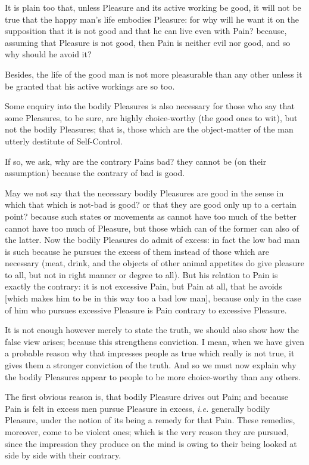 It is plain too that, unless Pleasure and its active working be good, it will
not be true that the happy man’s life embodies Pleasure: for why will he
want it on the supposition that it is not good and that he can live even with
Pain? because, assuming that Pleasure is not good, then Pain is neither evil
nor good, and so why should he avoid it?

Besides, the life of the good man is not more pleasurable than any other unless
it be granted that his active workings are so too.

Some enquiry into the bodily Pleasures is also necessary for those who say that
some Pleasures, to be sure, are highly choice-worthy (the good ones to wit),
but not the bodily Pleasures; that is, those which are the object-matter of the
man utterly destitute of Self-Control.

If so, we ask, why are the contrary Pains bad? they cannot be (on their
assumption) because the contrary of bad is good.

May we not say that the necessary bodily Pleasures are good in the sense in
which that which is not-bad is good? or that they are good only up to a certain
point? because such states or movements as cannot have too much of the better
cannot have too much of Pleasure, but those which can of the former can also of
the latter. Now the bodily Pleasures do admit of excess: in fact the low bad
man is such because he pursues the excess of them instead of those which are
necessary (meat, drink, and the objects of other animal appetites do give
pleasure to all, but not in right manner or degree to all). But his relation to
Pain is exactly the contrary: it is not excessive Pain, but Pain at all, that
he avoids [which makes him to be in this way too a bad low man], because only
in the case of him who pursues excessive Pleasure is Pain contrary to excessive
Pleasure.

It is not enough however merely to state the truth, we should also show how the
false view arises; because this strengthens conviction. I mean, when we have
given a probable reason why that impresses people as true which really is not
true, it gives them a stronger conviction of the truth. And so we must now
explain why the bodily Pleasures appear to people to be more choice-worthy than
any others.

The first obvious reason is, that bodily Pleasure drives out Pain; and because
Pain is felt in excess men pursue Pleasure in excess, \emph{i.e.} generally
bodily Pleasure, under the notion of its being a remedy for that Pain. These
remedies, moreover, come to be violent ones; which is the very reason they are
pursued, since the impression they produce on the mind is owing to their being
looked at side by side with their contrary.

